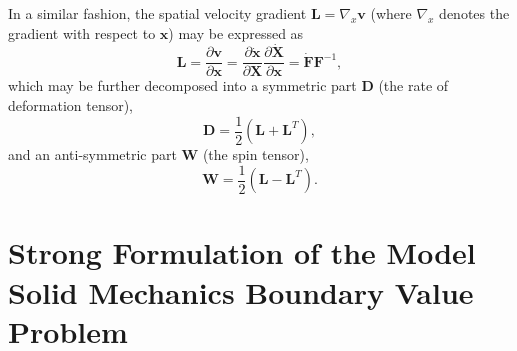 In a similar fashion, the spatial velocity gradient $\mathbf{L} = \nabla_x \mathbf{v}$ (where $\nabla_x$ denotes the gradient with respect to $\mathbf{x}$) may be expressed as
\begin{equation}
  \mathbf{L} = \frac{\partial \mathbf{v}}{\partial \mathbf{x}} = \frac{\partial \dot{\mathbf{x}}}{\partial \mathbf{X}} \frac{\partial \dot{\mathbf{X}}}{\partial \mathbf{x}} = \dot{\mathbf{F}} \mathbf{F}^{-1},
\end{equation}
which may be further decomposed into a symmetric part $\mathbf{D}$ (the rate of deformation tensor),
\begin{equation}
  \mathbf{D} = \frac{1}{2} (\mathbf{L} + \mathbf{L}^T),
\end{equation}
and an anti-symmetric part $\mathbf{W}$ (the spin tensor),
\begin{equation}
  \mathbf{W} = \frac{1}{2} (\mathbf{L} - \mathbf{L}^T).
\end{equation}


\section{Strong Formulation of the Model Solid Mechanics Boundary Value Problem}

